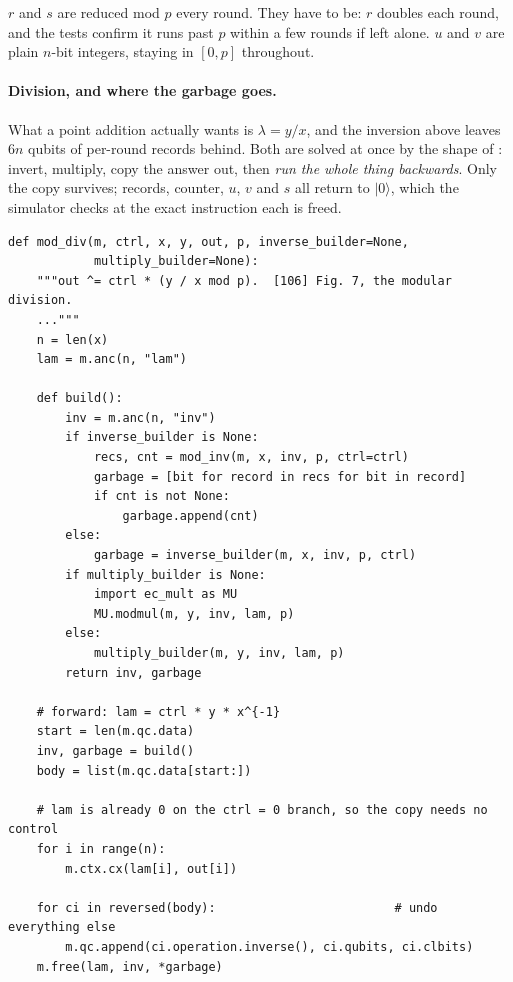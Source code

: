 \documentclass[11pt]{article}
\renewcommand{\ket}[1]{\lvert #1 \rangle}
\theoremstyle{plain}
\theoremstyle{remark}
\begin{document}
\noindent
$r$ and $s$ are reduced mod $p$ every round. They have to be: $r$ doubles each round, and the tests
confirm it runs past $p$ within a few rounds if left alone. $u$ and $v$ are plain $n$-bit integers,
staying in $[0,p]$ throughout.

\paragraph{Division, and where the garbage goes.}
What a point addition actually wants is $\lambda = y/x$, and the inversion above leaves $6n$ qubits
of per-round records behind. Both are solved at once by the shape of \cite{ec:rnsl17}: invert,
multiply, copy the answer out, then \emph{run the whole thing backwards}. Only the copy survives;
records, counter, $u$, $v$ and $s$ all return to $\ket0$, which the simulator checks at the exact
instruction each is freed.

\begin{lstlisting}
def mod_div(m, ctrl, x, y, out, p, inverse_builder=None,
            multiply_builder=None):
    """out ^= ctrl * (y / x mod p).  [106] Fig. 7, the modular division.
    ..."""
    n = len(x)
    lam = m.anc(n, "lam")

    def build():
        inv = m.anc(n, "inv")
        if inverse_builder is None:
            recs, cnt = mod_inv(m, x, inv, p, ctrl=ctrl)
            garbage = [bit for record in recs for bit in record]
            if cnt is not None:
                garbage.append(cnt)
        else:
            garbage = inverse_builder(m, x, inv, p, ctrl)
        if multiply_builder is None:
            import ec_mult as MU
            MU.modmul(m, y, inv, lam, p)
        else:
            multiply_builder(m, y, inv, lam, p)
        return inv, garbage

    # forward: lam = ctrl * y * x^{-1}
    start = len(m.qc.data)
    inv, garbage = build()
    body = list(m.qc.data[start:])

    # lam is already 0 on the ctrl = 0 branch, so the copy needs no control
    for i in range(n):
        m.ctx.cx(lam[i], out[i])

    for ci in reversed(body):                         # undo everything else
        m.qc.append(ci.operation.inverse(), ci.qubits, ci.clbits)
    m.free(lam, inv, *garbage)
\end{lstlisting}
\end{document}
